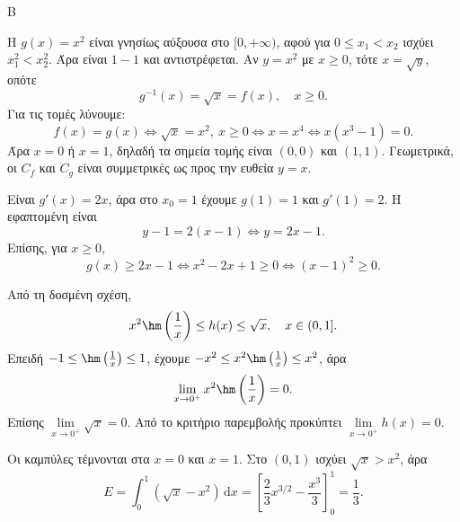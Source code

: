 

\begin{thema}{Β}
\begin{erwthma}
\item Η $g(x)=x^2$ είναι γνησίως αύξουσα στο $[0,+\infty)$, αφού για $0\le x_1<x_2$ ισχύει $x_1^2<x_2^2$. Άρα είναι $1-1$ και αντιστρέφεται. Αν $y=x^2$ με $x\ge0$, τότε $x=\sqrt y$, οπότε
\[
g^{-1}(x)=\sqrt x=f(x),\quad x\ge0.
\]
Για τις τομές λύνουμε:
\[
f(x)=g(x)\Leftrightarrow \sqrt x=x^2,\ x\ge0
\Leftrightarrow x=x^4\Leftrightarrow x(x^3-1)=0.
\]
Άρα $x=0$ ή $x=1$, δηλαδή τα σημεία τομής είναι $(0,0)$ και $(1,1)$. Γεωμετρικά, οι $C_f$ και $C_g$ είναι συμμετρικές ως προς την ευθεία $y=x$.

\item Είναι $g'(x)=2x$, άρα στο $x_0=1$ έχουμε $g(1)=1$ και $g'(1)=2$. Η εφαπτομένη είναι
\[
y-1=2(x-1)\Leftrightarrow y=2x-1.
\]
Επίσης, για $x\ge0$,
\[
g(x)\ge2x-1\Leftrightarrow x^2-2x+1\ge0\Leftrightarrow (x-1)^2\ge0.
\]

\item Από τη δοσμένη σχέση,
\[
x^2\hm\left(\frac1x\right)\le h(x)\le \sqrt x,\quad x\in(0,1].
\]
Επειδή $-1\le\hm\left(\frac1x\right)\le1$, έχουμε $-x^2\le x^2\hm\left(\frac1x\right)\le x^2$, άρα
\[
\lim_{x\to0^+}x^2\hm\left(\frac1x\right)=0.
\]
Επίσης $\lim\limits_{x\to0^+}\sqrt x=0$. Από το κριτήριο παρεμβολής προκύπτει $\lim\limits_{x\to0^+}h(x)=0$.

\item Οι καμπύλες τέμνονται στα $x=0$ και $x=1$. Στο $(0,1)$ ισχύει $\sqrt x>x^2$, άρα
\[
E=\int_0^1(\sqrt x-x^2)\,\mathrm{d}x
=\left[\frac23x^{3/2}-\frac{x^3}{3}\right]_0^1
=\frac13.
\]
\end{erwthma}
\end{thema}



